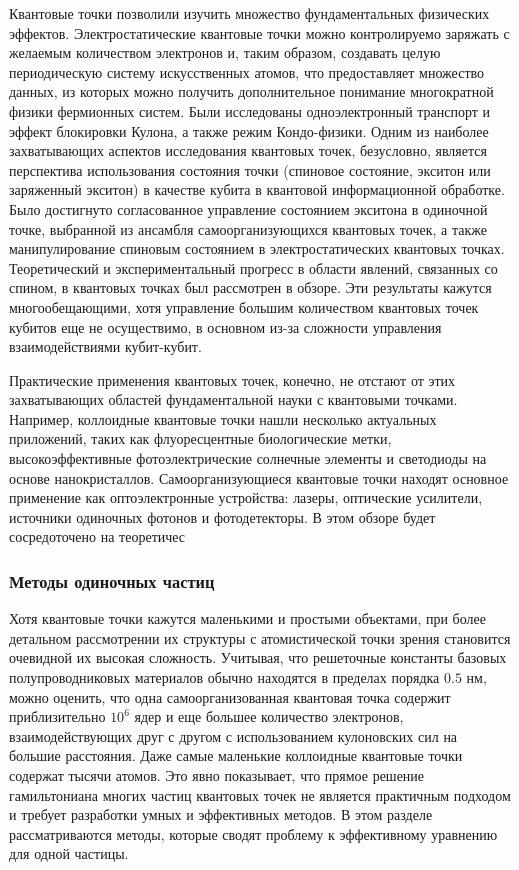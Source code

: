 \documentclass[a4paper,14pt]{extarticle}
\begin{document}
Квантовые точки позволили изучить множество фундаментальных физических эффектов. Электростатические квантовые точки можно контролируемо заряжать с желаемым количеством электронов и, таким образом, создавать целую периодическую систему искусственных атомов, что предоставляет множество данных, из которых можно получить дополнительное понимание многократной физики фермионных систем. Были исследованы одноэлектронный транспорт и эффект блокировки Кулона, а также режим Кондо-физики. Одним из наиболее захватывающих аспектов исследования квантовых точек, безусловно, является перспектива использования состояния точки (спиновое состояние, экситон или заряженный экситон) в качестве кубита в квантовой информационной обработке. Было достигнуто согласованное управление состоянием экситона в одиночной точке, выбранной из ансамбля самоорганизующихся квантовых точек, а также манипулирование спиновым состоянием в электростатических квантовых точках. Теоретический и экспериментальный прогресс в области явлений, связанных со спином, в квантовых точках был рассмотрен в обзоре. Эти результаты кажутся многообещающими, хотя управление большим количеством квантовых точек кубитов еще не осуществимо, в основном из-за сложности управления взаимодействиями кубит-кубит.

Практические применения квантовых точек, конечно, не отстают от этих захватывающих областей фундаментальной науки с квантовыми точками. Например, коллоидные квантовые точки нашли несколько актуальных приложений, таких как флуоресцентные биологические метки, высокоэффективные фотоэлектрические солнечные элементы и светодиоды на основе нанокристаллов. Самоорганизующиеся квантовые точки находят основное применение как оптоэлектронные устройства: лазеры, оптические усилители, источники одиночных фотонов и фотодетекторы. В этом обзоре будет сосредоточено на теоретичес

\subsubsection{Методы одиночных частиц}

Хотя квантовые точки кажутся маленькими и простыми объектами, при более детальном рассмотрении их структуры с атомистической точки зрения становится очевидной их высокая сложность. Учитывая, что решеточные константы базовых полупроводниковых материалов обычно находятся в пределах порядка \( 0.5 \) нм, можно оценить, что одна самоорганизованная квантовая точка содержит приблизительно \( 10^6 \) ядер и еще большее количество электронов, взаимодействующих друг с другом с использованием кулоновских сил на большие расстояния. Даже самые маленькие коллоидные квантовые точки содержат тысячи атомов. Это явно показывает, что прямое решение гамильтониана многих частиц квантовых точек не является практичным подходом и требует разработки умных и эффективных методов. В этом разделе рассматриваются методы, которые сводят проблему к эффективному уравнению для одной частицы.
\end{document}
